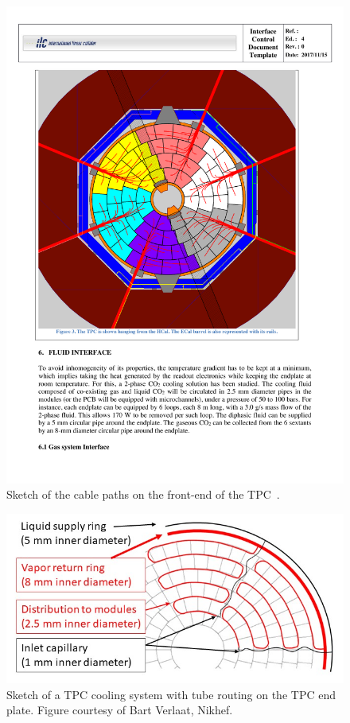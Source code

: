 \begin{figure}[h!]
    \centering
    \includegraphics[width=0.6\hsize]{Integration/fig/TPC_Cables.pdf}
    \caption{Sketch of the cable paths on the front-end of the TPC~\cite{ild:bib:TPC_ICD}.}
    \label{ILD:fig:tpc_cables}
\end{figure}
\begin{figure}[h!]
    \centering
    \includegraphics[width=1.0\hsize]{Integration/fig/TPC_Cooling_v2.png}
    \caption{Sketch of a TPC cooling system with tube routing on the TPC end plate. Figure courtesy of Bart Verlaat, Nikhef.}
    \label{ILD:fig:tpc_cooling}
\end{figure}

